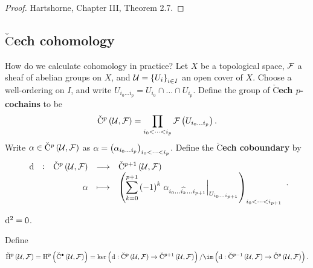 \begin{proof}
Hartshorne, Chapter III, Theorem 2.7.
\end{proof}

\pagebreak

\subsection{\texorpdfstring{$\check{\text{C}}$ech}{Cech} cohomology}

How do we calculate cohomology in practice? Let $ X $ be a topological space, $ \mathcal{F} $ a sheaf of abelian groups on $ X $, and $ \UUU = \cbr{U_i}_{i \in I} $ an open cover of $ X $. Choose a well-ordering on $ I $, and write $ U_{i_0 \dots i_p} = U_{i_0} \cap \dots \cap U_{i_p} $. Define the group of \textbf{$\check{\text{C}}$ech $ p $-cochains} to be
$$ \vC^p\br{\UUU, \FFF} = \prod_{i_0 < \dots < i_p} \FFF\br{U_{i_0 \dots i_p}}. $$
Write $ \alpha \in \vC^p\br{\UUU, \FFF} $ as $ \alpha = \br{\alpha_{i_0 \dots i_p}}_{i_0 < \dots < i_p} $. Define the \textbf{$\check{\text{C}}$ech coboundary} by
$$ \function[\d]{\vC^p\br{\UUU, \FFF}}{\vC^{p + 1}\br{\UUU, \FFF}}{\alpha}{\br{\sum_{k = 0}^{p + 1} \br{-1}^k\eval{\alpha_{i_0 \dots \widehat{i_k} \dots i_{p + 1}}}_{U_{i_0 \dots i_{p + 1}}}}_{i_0 < \dots < i_{p + 1}}}. $$

\begin{exercise*}
$ \mathrm{d}^2 = 0 $.
\end{exercise*}

Define
$$ \vH^p\br{\UUU, \FFF} = \H^p\br{\vC^\bullet\br{\UUU, \FFF}} = \ker \br{\d : \vC^p\br{\UUU, \FFF} \to \vC^{p + 1}\br{\UUU, \FFF}} / \im \br{\d : \vC^{p - 1}\br{\UUU, \FFF} \to \vC^p\br{\UUU, \FFF}}. $$

